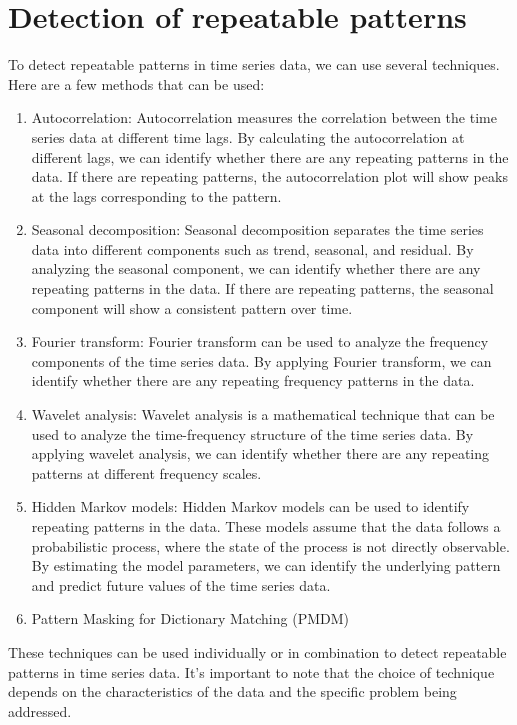\section{Detection of repeatable patterns}
To detect repeatable patterns in time series data, we can use several techniques. Here are a few methods that
can be used:
\begin{enumerate}
    \item Autocorrelation: Autocorrelation measures the correlation between the time series data at different time lags.
    By calculating the autocorrelation at different lags, we can identify whether there are any repeating
    patterns in the data. If there are repeating patterns, the autocorrelation plot will show peaks at the lags
    corresponding to the pattern.
    \item Seasonal decomposition: Seasonal decomposition separates the time series data into different components
    such as trend, seasonal, and residual. By analyzing the seasonal component, we can identify whether there
    are any repeating patterns in the data. If there are repeating patterns, the seasonal component will
    show a consistent pattern over time.
    \item Fourier transform: Fourier transform can be used to analyze the frequency components of the time series data.
    By applying Fourier transform, we can identify whether there are any repeating frequency patterns in the data.
    \item Wavelet analysis: Wavelet analysis is a mathematical technique that can be used to analyze the time-frequency
    structure of the time series data. By applying wavelet analysis, we can identify whether there are any repeating
    patterns at different frequency scales.
    \item Hidden Markov models: Hidden Markov models can be used to identify repeating patterns in the data.
    These models assume that the data follows a probabilistic process, where the state of the process is not directly
    observable. By estimating the model parameters, we can identify the underlying pattern and predict future
    values of the time series data.
    \item Pattern Masking for Dictionary Matching (PMDM)
\end{enumerate}
These techniques can be used individually or in combination to detect repeatable patterns in time series data.
It's important to note that the choice of technique depends on the characteristics of the data and the specific
problem being addressed.

